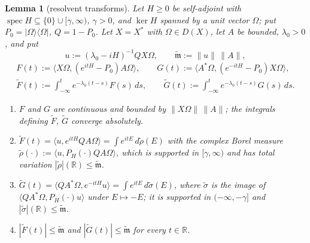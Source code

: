 \documentclass[11pt,a4paper]{article}
\newcommand{\R}{\mathbb{R}}
\newcommand{\Om}{\Omega}
\newcommand{\ip}[2]{\langle #1,#2\rangle}
\DeclareMathOperator{\spec}{spec}
\newcommand{\Ft}{\widetilde F}
\newcommand{\Gt}{\widetilde G}
\newcommand{\mt}{\widetilde{\mathfrak m}}
\theoremstyle{plain}
\newtheorem{tlemma}{Lemma}
\theoremstyle{definition}
\begin{document}
\begin{tlemma}[resolvent transforms]\label{lem:transforms}
Let $H\ge0$ be self-adjoint with $\spec H\subseteq\{0\}\cup[\gamma,\infty)$, $\gamma>0$, and
$\ker H$ spanned by a unit vector $\Om$; put $P_0=|\Om\rangle\langle\Om|$, $Q=1-P_0$.  Let
$X=X^*$ with $\Om\in D(X)$, let $A$ be bounded, $\lambda_0>0$, and put
\[
 u:=(\lambda_0-iH)^{-1}QX\Om,\qquad \mt:=\|u\|\,\|A\|,
\]
\begin{gather*}
 F(t):=\ip{X\Om}{(e^{itH}-P_0)A\Om},\qquad G(t):=\ip{A^*\Om}{(e^{-itH}-P_0)X\Om},\\
 \Ft(t):=\int_{-\infty}^te^{-\lambda_0(t-s)}F(s)\,ds,\qquad
 \Gt(t):=\int_{-\infty}^te^{-\lambda_0(t-s)}G(s)\,ds .
\end{gather*}
\begin{enumerate}
\item[\rm(i)] $F$ and $G$ are continuous and bounded by $\|X\Om\|\,\|A\|$; the integrals
defining $\Ft$, $\Gt$ converge absolutely.
\item[\rm(ii)] $\Ft(t)=\ip{u}{e^{itH}QA\Om}=\int e^{itE}\,d\tilde\rho(E)$ with the complex
Borel measure $\tilde\rho(\cdot):=\ip{u}{P_H(\cdot)QA\Om}$, which is supported in
$[\gamma,\infty)$ and has total variation $|\tilde\rho|(\R)\le\mt$.
\item[\rm(iii)] $\Gt(t)=\ip{QA^*\Om}{e^{-itH}u}=\int e^{itE}\,d\tilde\sigma(E)$, where
$\tilde\sigma$ is the image of $\ip{QA^*\Om}{P_H(\cdot)u}$ under $E\mapsto-E$; it is supported
in $(-\infty,-\gamma]$ and $|\tilde\sigma|(\R)\le\mt$.
\item[\rm(iv)] $|\Ft(t)|\le\mt$ and $|\Gt(t)|\le\mt$ for every $t\in\R$.
\end{enumerate}
\end{tlemma}
\end{document}
